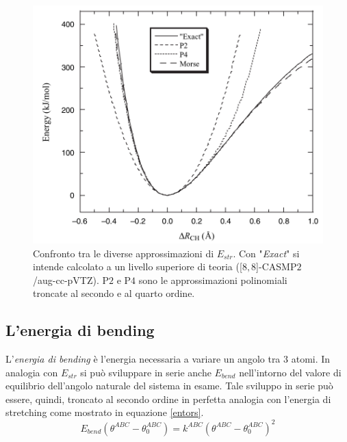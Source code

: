 \documentclass[oneside]{amsbook}
\numberwithin{section}{chapter}
\numberwithin{equation}{section}
\numberwithin{figure}{section}
\begin{document}
\begin{figure} 
\label{morsepot}
\centering
\caption{Confronto tra le diverse approssimazioni di $E_{str}$. Con "\emph{Exact}" si intende calcolato a un livello superiore di teoria ([$8,8$]-CASMP$2$/aug-cc-pVTZ). P$2$ e P$4$ sono le approssimazioni polinomiali troncate al secondo e al quarto ordine.}
\includegraphics[scale=0.4]{morsepot}
\end{figure}

\subsection{L'energia di bending }
L'\emph{energia di bending} è l'energia necessaria a variare un angolo tra  $3$ atomi. In analogia con $E_{str}$ si può sviluppare in serie anche $E_{bend}$ nell'intorno del valore di equilibrio dell'angolo naturale del sistema in esame. Tale sviluppo in serie può essere, quindi, troncato al secondo ordine in perfetta analogia con l'energia di stretching come mostrato in equazione \ref{entors}.
\begin{equation}
\label{entors}
E_{bend}(\theta^{ABC}-\theta^{ABC}_0)= k^{ABC} (\theta^{ABC}-\theta^{ABC}_0)^2
\end{equation}
\end{document}
